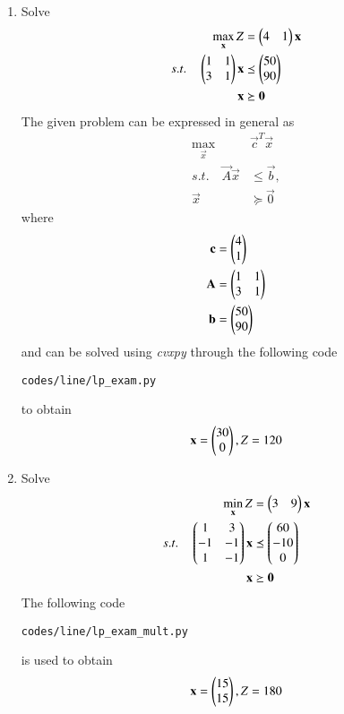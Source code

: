 \renewcommand{\theequation}{\theenumi}
\begin{enumerate}[label=\arabic*.,ref=\thesection.\theenumi]
%
\item Solve
\begin{align}
\max_{\mathbf{x}} Z &= \begin{pmatrix}4 & 1\end{pmatrix}\mathbf{x}
\\
s.t. \quad 
\begin{pmatrix}
1 & 1
\\
3 & 1
\end{pmatrix}
\mathbf{x} &\preceq \begin{pmatrix}50\\90\end{pmatrix}
\\
\mathbf{x} &\succeq \mathbf{0}
\end{align}
%
\solution The given problem can be expressed in general as
\begin{align}
\max_{\vec{x}} &\vec{c}^{T}\vec{x}
\\
s.t. \quad \vec{A}\vec{x} &\le \vec{b},
\\
\vec{x} &\succeq\vec{0}
\end{align}
%
where
\begin{align}
\vec{c} &= \myvec{4 \\ 1}
\\
\vec{A} &=
\myvec{
1 & 1
\\
3 & 1
}
\\
\vec{b}&=\myvec{50\\90}
%
\end{align}
%
and can be solved using {\em cvxpy} through the following code
\begin{lstlisting}
codes/line/lp_exam.py
\end{lstlisting}
%
to obtain
\begin{align}
\mathbf{x} = \begin{pmatrix}30\\0\end{pmatrix}, Z = 120
\end{align}
%
%

\item Solve
\begin{align}
\min_{\mathbf{x}} Z &= \begin{pmatrix}3 & 9\end{pmatrix}\mathbf{x}
\\
s.t. \quad 
\begin{pmatrix}
1 & 3
\\
-1 & -1
\\
1 & -1
\end{pmatrix}
\mathbf{x} &\preceq \begin{pmatrix}60\\-10\\0\end{pmatrix}
\\
\mathbf{x} &\succeq \mathbf{0}
\label{eq:lp_exam_mult}
\end{align}
\solution The following code
\begin{lstlisting}
codes/line/lp_exam_mult.py
\end{lstlisting}
%
is used to obtain
\begin{align}
\mathbf{x} = \begin{pmatrix}15\\15\end{pmatrix}, Z = 180
\end{align}



\end{enumerate}
